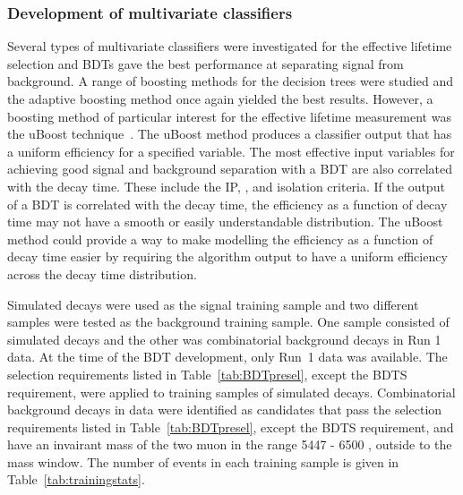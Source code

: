 \subsubsection{Development of \el multivariate classifiers}
\label{sec:dev_BDTs}
Several types of multivariate classifiers were investigated for the effective lifetime selection and BDTs gave the best performance at separating signal from background. A range of boosting methods for the decision trees were studied and the adaptive boosting method once again yielded the best results. %
However, a boosting method of particular interest for the effective lifetime measurement was the uBoost technique~\cite{Stevens:2013dya}. The uBoost method produces a classifier output that has a uniform efficiency for a specified variable. The most effective input variables for achieving good signal and background separation with a BDT are also correlated with the decay time. These include the \bs IP, \chiIP, \chiFD and isolation criteria. %
If the output of a BDT is correlated with the \bs decay time, the efficiency as a function of decay time may not have a smooth or easily understandable distribution. The uBoost method could provide a way to make modelling the efficiency as a function of decay time easier by requiring the algorithm output to have a uniform efficiency across the decay time distribution.

Simulated \bsmumu decays were used as the signal training sample and two different samples were tested as the background training sample. One sample consisted of simulated \bbbarmumux decays and the other was combinatorial background decays in Run 1 data. At the time of the BDT development, only Run~1 data was available. The selection requirements listed in Table~\ref{tab:BDTpresel}, except the BDTS requirement, were applied to training samples of simulated decays. Combinatorial background decays in data were identified as \bsmumu candidates that pass the selection requirements listed in Table~\ref{tab:BDTpresel}, except the BDTS requirement, and have an invairant mass of the two muon in the range 5447 - 6500 \mevcc, outside to the \bs mass window. The number of events in each training sample is given in Table~\ref{tab:trainingstats}.



